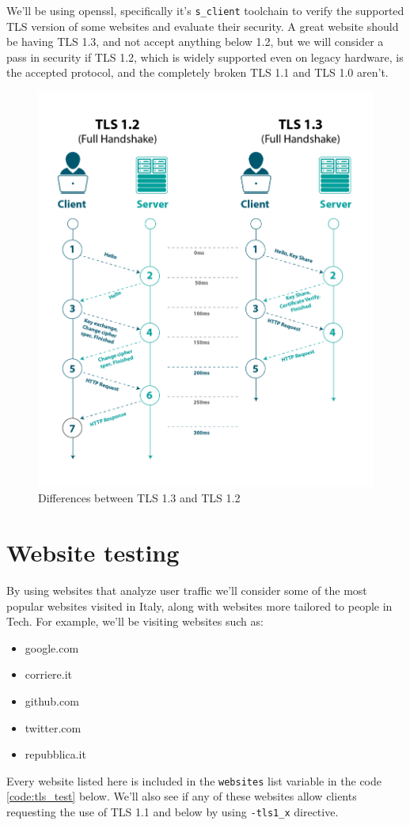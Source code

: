 \documentclass{article}
\begin{document}
We'll be using openssl, specifically it's \texttt{s\_client} toolchain to verify the supported TLS version of some websites and evaluate their security.
A great website should be having TLS 1.3, and not accept anything below 1.2, but we will consider a pass in security if TLS 1.2, which is widely supported even on legacy hardware, is the accepted protocol, and the completely broken TLS 1.1 and TLS 1.0 aren't.
\begin{figure}
    \centering
    \includegraphics[width=0.6\linewidth]{tls_diff.png}
    \caption{Differences between TLS 1.3 and TLS 1.2}
    \label{fig:tls_diff}
\end{figure}

\section*{Website testing}
By using websites that analyze user traffic we'll consider some of the most popular websites visited in Italy, along with websites more tailored to people in Tech. For example, we'll be visiting websites such as:
\begin{itemize}
    \item google.com
    \item corriere.it
    \item github.com
    \item twitter.com
    \item repubblica.it
\end{itemize}
Every website listed here is included in the \texttt{websites} list variable in the code \ref{code:tls_test} below. We'll also see if any of these websites allow clients requesting the use of TLS 1.1 and below by using \texttt{-tls1\_x} directive.
\end{document}

